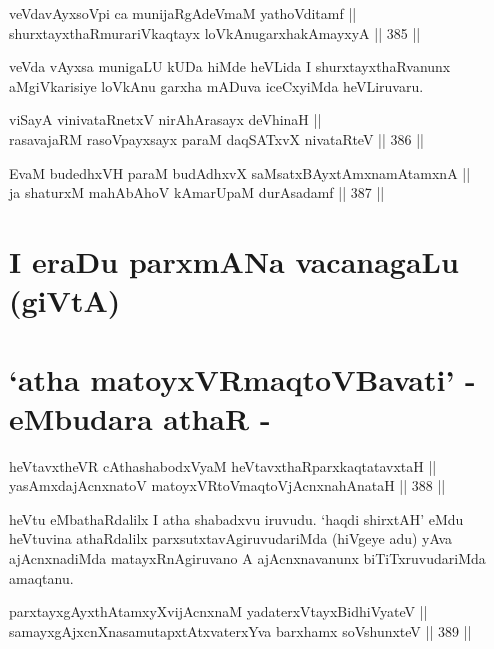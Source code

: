 \begin{shl}
veVdavAyxsoV\s pi ca munijaRgAdeVmaM yathoVditamf || \\
shurxtayxthaRmurariVkaqtayx loVkAnugarxhakAmayxyA \hfill || 385 ||  
\end{shl}

\begin{artha}
veVda vAyxsa munigaLU kUDa hiMde heVLida I shurxtayxthaRvanunx
aMgiVkarisiye loVkAnu garxha mADuva iceCxyiMda heVLiruvaru.
\end{artha}


\begin{shl}
viSayA vinivataRnetxV nirAhArasayx deVhinaH || \\
rasavajaRM rasoV\s payxsayx paraM daqSATxvX nivataRteV \hfill || 386 ||  
\end{shl}

\begin{shl}
EvaM budedhxVH paraM budAdhxvX saMsatxBAyx\s \s tAmxnamAtamxnA || \\
ja shaturxM mahAbAhoV kAmarUpaM durAsadamf \hfill || 387 ||  
\end{shl}

\section*{I eraDu parxmANa vacanagaLu (giVtA)}

\section*{`atha matoyxVR\s maqtoVBavati' - eMbudara athaR -}

\begin{shl}
heVtavxtheVR cAthashabodxV\s yaM heVtavxthaRparxkaqtatavxtaH || \\
yasAmxdajAcnxnatoV matoyxVR\s toV\s maqtoV\s jAcnxnahAnataH \hfill || 388 ||  
\end{shl}

\begin{artha}
heVtu eMbathaRdalilx I atha shabadxvu iruvudu. `haqdi shirxtAH' eMdu
heVtuvina athaRdalilx parxsutxtavAgiruvudariMda (hiVgeye adu) yAva
ajAcnxnadiMda matayxRnAgiruvano A ajAcnxnavanunx biTiTxruvudariMda
amaqtanu.
\end{artha}


\begin{shl}
parxtayxgAyxthAtamxyXvijAcnxnaM yadaterxVtayxBidhiVyateV || \\
samayxgAjxcnXnasamutapxtAtxvaterxYva barxhamx soV\s shunxteV \hfill || 389 ||  
\end{shl}

